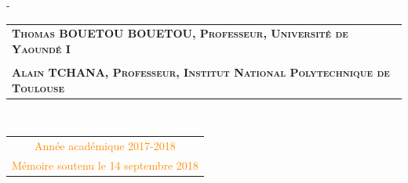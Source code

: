 \begin{titlingpage}
\begin{SingleSpace}
\begin{adjustwidth*}{\unitlength}{-\unitlength}
\begin{center}
\begin{tabular}{>{\centering\arraybackslash}p{16cm}}
{\Large Examinateur:} {\large \textsc{\textbf{Thomas BOUETOU BOUETOU, Professeur, Université de Yaoundé I}}}\\ \\

{\Large Rapporteur:} {\large \textsc{\textbf{Alain TCHANA, Professeur, Institut National Polytechnique de Toulouse}}}
\end{tabular}\\
\vspace{6.5mm}
\begin{tabular}{c}
{\large \textcolor{darkorange}{Année académique 2017-2018}}\\
\vspace{6.5mm}
{\large \textcolor{darkorange}{Mémoire soutenu le 14 septembre 2018}}
\end{tabular}


\end{center}


\end{adjustwidth*}

\end{SingleSpace}
\end{titlingpage}
